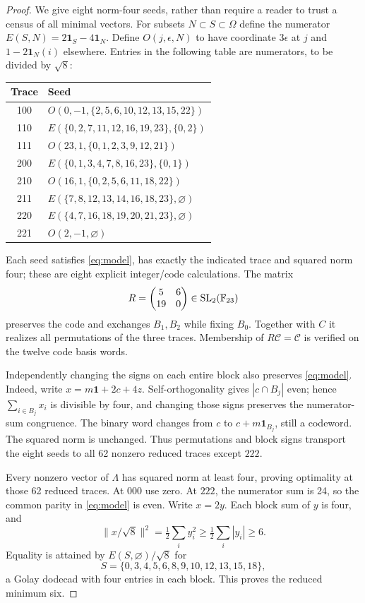 \documentclass[10pt,reqno]{amsart}
\theoremstyle{remark}\newtheorem{remark}[theorem]{Remark}
\newcommand{\La}{\Lambda}\newcommand{\tr}{\operatorname{tr}}
\newcommand{\one}{\mathbf1}\newcommand{\Span}{\operatorname{span}}
\begin{document}
\begin{proof}
We give eight norm-four seeds, rather than require a reader to trust a census of all minimal vectors. For subsets $N\subset S\subset\Omega$ define the numerator
$E(S,N)=2\one_S-4\one_N$. Define $O(j,\epsilon,N)$ to have coordinate $3\epsilon$ at $j$ and $1-2\one_N(i)$ elsewhere. Entries in the following table are numerators, to be divided by $\sqrt8$:
\begin{center}\small
\begin{tabular}{cl}
\toprule
Trace&Seed\\\midrule
100&$O(0,-1,\{2,5,6,10,12,13,15,22\})$\\
110&$E(\{0,2,7,11,12,16,19,23\},\{0,2\})$\\
111&$O(23,1,\{0,1,2,3,9,12,21\})$\\
200&$E(\{0,1,3,4,7,8,16,23\},\{0,1\})$\\
210&$O(16,1,\{0,2,5,6,11,18,22\})$\\
211&$E(\{7,8,12,13,14,16,18,23\},\varnothing)$\\
220&$E(\{4,7,16,18,19,20,21,23\},\varnothing)$\\
221&$O(2,-1,\varnothing)$\\\bottomrule
\end{tabular}
\end{center}
Each seed satisfies \eqref{eq:model}, has exactly the indicated trace and squared norm four; these are eight explicit integer/code calculations. The matrix
\[
R=\begin{pmatrix}5&6\\19&0\end{pmatrix}\in\operatorname{SL}_2(\mathbb F_{23})
\]
preserves the code and exchanges $B_1,B_2$ while fixing $B_0$. Together with $C$ it realizes all permutations of the three traces. Membership of $R\mathcal C=\mathcal C$ is verified on the twelve code basis words.

Independently changing the signs on each entire block also preserves \eqref{eq:model}. Indeed, write $x=m\one+2c+4z$. Self-orthogonality gives $|c\cap B_j|$ even; hence $\sum_{i\in B_j}x_i$ is divisible by four, and changing those signs preserves the numerator-sum congruence. The binary word changes from $c$ to $c+m\one_{B_j}$, still a codeword. The squared norm is unchanged. Thus permutations and block signs transport the eight seeds to all 62 nonzero reduced traces except $222$.

Every nonzero vector of $\La$ has squared norm at least four, proving optimality at those 62 reduced traces. At $000$ use zero. At $222$, the numerator sum is 24, so the common parity in \eqref{eq:model} is even. Write $x=2y$. Each block sum of $y$ is four, and
\[
\|x/\sqrt8\|^2=\tfrac12\sum_i y_i^2
\ge\tfrac12\sum_i|y_i|\ge6.
\]
Equality is attained by $E(S,\varnothing)/\sqrt8$ for
\[
S=\{0,3,4,5,6,8,9,10,12,13,15,18\},
\]
a Golay dodecad with four entries in each block. This proves the reduced minimum six.


\end{proof}
\end{document}
